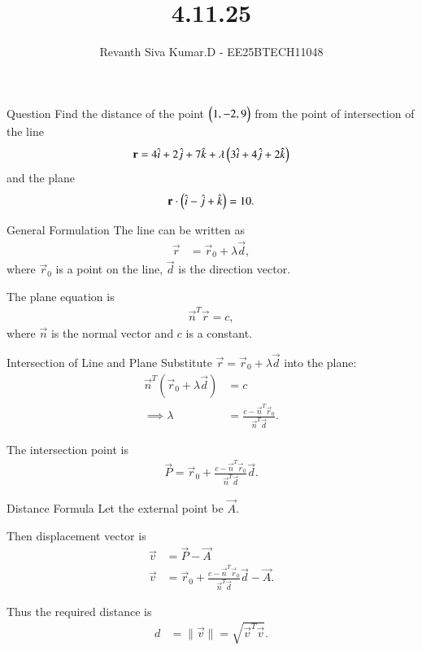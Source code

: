 \documentclass{beamer}
\title %
{4.11.25}
\author %
{Revanth Siva Kumar.D - EE25BTECH11048}
\begin{document}
	
	\frame{\titlepage}
	
	\begin{frame}{Question}
		Find the distance of the point $\begin{pmatrix}1,-2,9\end{pmatrix}$ from the point of intersection of the line
		\[
		\mathbf{r} = 4\hat{i} + 2\hat{j} + 7\hat{k} + \lambda \begin{pmatrix}3\hat{i} + 4\hat{j} + 2\hat{k}\end{pmatrix}
		\]
		and the plane
		\[
		\mathbf{r}\cdot\begin{pmatrix}\hat{i} - \hat{j} + \hat{k}\end{pmatrix} = 10.
		\]
	\end{frame}
	
	
	\begin{frame}{General Formulation}
	The line can be written as
	\begin{align}
	    \vec{r} &= \vec{r}_0 + \lambda \vec{d},
	\end{align}
	where $\vec{r}_0$ is a point on the line, $\vec{d}$ is the direction vector.
	
	The plane equation is
	\begin{align}
	    \vec{n}^T \vec{r} = c,
	\end{align}
	where $\vec{n}$ is the normal vector and $c$ is a constant.
	\end{frame}
	
	
	\begin{frame}{Intersection of Line and Plane}
	Substitute $\vec{r} = \vec{r}_0 + \lambda \vec{d}$ into the plane:
	\begin{align}
	    \vec{n}^T(\vec{r}_0 + \lambda \vec{d}) &= c \\
	    \implies \lambda &= \frac{c - \vec{n}^T \vec{r}_0}{\vec{n}^T \vec{d}}.
	\end{align}
	
	The intersection point is
	\begin{align}
	    \vec{P} = \vec{r}_0 + \frac{c - \vec{n}^T \vec{r}_0}{\vec{n}^T \vec{d}} \vec{d}.
	\end{align}
	\end{frame}
	
	
	\begin{frame}{Distance Formula}
	Let the external point be $\vec{A}$.
	
	Then displacement vector is
	\begin{align}
	    \vec{v} &= \vec{P} - \vec{A}\\
	    \vec{v} &= \vec{r}_0 + \frac{c - \vec{n}^T \vec{r}_0}{\vec{n}^T \vec{d}} \vec{d} -\vec{A}.
	\end{align}
	
	Thus the required distance is
	\begin{align}
	    d &= \|\vec{v}\| = \sqrt{\vec{v}^T \vec{v}}.
	\end{align}
	\end{frame}
	
\end{document}
